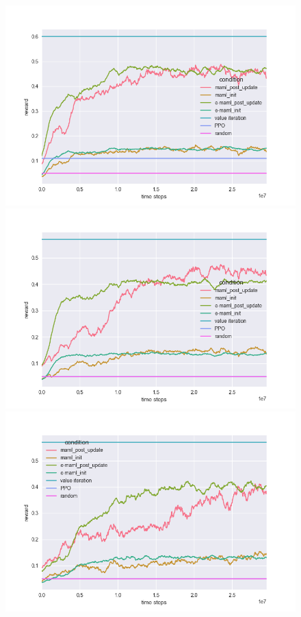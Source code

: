 \begin{figure}[H]
\begin{center}
\includegraphics[scale=0.335]{bradly_curves/gap_grids_maml_0.png}%
\includegraphics[scale=0.335]{bradly_curves/gap_grids_maml_1.png} \\
\includegraphics[scale=0.335]{bradly_curves/gap_grids_maml_3.png}%

\end{center}
\end{figure}
